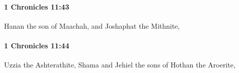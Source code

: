 		\paragraph{1 Chronicles 11:43} %
			\label{1CHRONICLES-11-43}

			Hanan the son of Maachah, and Joshaphat the Mithnite,


		\paragraph{1 Chronicles 11:44} %
			\label{1CHRONICLES-11-44}

			Uzzia the Ashterathite, Shama and Jehiel the sons of Hothan the Aroerite,


